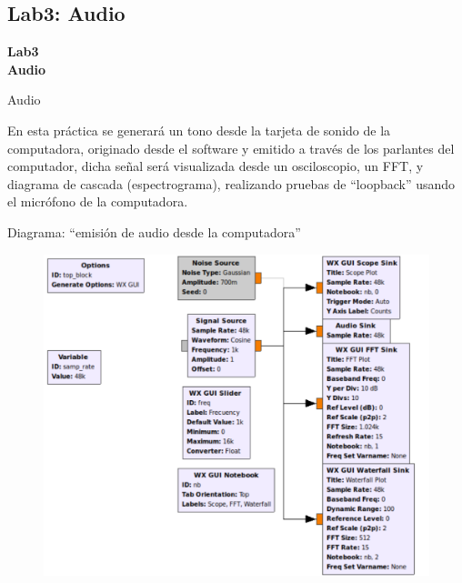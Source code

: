 \subsection{Lab3: Audio}
\begin{frame}{}


\bfseries{\textrm{\LARGE Lab3\\ \Large Audio}}
\raggedright
\end{frame}

\begin{frame}{Audio }



En esta práctica se generará un tono desde la tarjeta de sonido de la
computadora, originado desde el software y emitido a través de los parlantes
del computador, dicha señal será visualizada desde un osciloscopio, un FFT, y
diagrama de cascada (espectrograma), realizando pruebas de ``loopback'' usando el
micrófono de la computadora.

\end{frame}

\begin{frame}{Diagrama:  ``emisión de audio desde la computadora''}

\begin{figure}

\begin{center}
\vspace{-0.3cm}
\includegraphics[width=.7\textwidth]{parte1/lab3/pdf/lab3_1.pdf}
\end{center}
\end{figure}

\end{frame}

